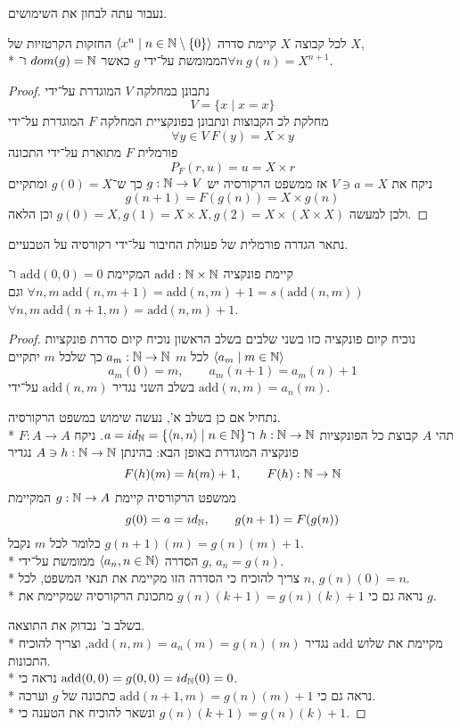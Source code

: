 נעבור עתה לבחון את השימושים.
\begin{theorem}
	לכל קבוצה $X$ קיימת סדרה $\langle x^n \mid n \in \mathbb{N} \setminus \{0\}\rangle$ החזקות הקרטזיות של $X$, \\*
	הממומשת על־ידי $g$ כאשר $dom(g) = \mathbb{N}$ ו־$\forall n\ g(n) = X^{n + 1}$.
\end{theorem}
\begin{proof}
	נתבונן במחלקה $V$ המוגדרת על־ידי
	\[
		V = \{ x \mid x = x \}
	\]
	מחלקת לכ הקבוצות ונתבונן בפונקציית המחלקה $F$ המוגדרת על־ידי
	\[
		\forall y \in V\ F(y) = X \times y
	\]
	פורמלית $F$ מתוארת על־ידי התכונה
	\[
		P_F(r, u) = u = X \times r
	\]
	ניקח את $V \ni a = X$ אז ממשפט הרקורסיה יש $g : \mathbb{N} \to V$ כך ש־$g(0) = X$ ומתקיים
	\[
		g(n + 1) = F(g(n)) = X \times g(n)
	\]
	ולכן למעשה $g(0) = X, g(1) = X \times X, g(2) = X \times (X \times X)$ וכן הלאה.
\end{proof}
נתאר הגדרה פורמלית של פעולת החיבור על־ידי רקורסיה על הטבעיים.
\begin{theorem}
	קיימת פונקציה $\text{add} : \mathbb{N} \times \mathbb{N}$ המקיימת $\text{add}(0, 0) = 0$
	ו־$\forall n, m\ \text{add}(n, m + 1) = \text{add}(n, m) + 1 = s(\text{add}(n, m))$
	וגם $\forall n, m\ \text{add}(n + 1, m) = \text{add}(n, m) + 1$.
\end{theorem}
\begin{proof}
	נוכיח קיום פונקציה כזו בשני שלבים
	בשלב הראשון נוכיח קיום סדרת פונקציות $\langle a_m \mid m \in \mathbb{N} \rangle$ לכל $m$ $a_m : \mathbb{N} \to \mathbb{N}$
	כך שלכל $m$ יתקיים
	\[
		a_m(0) = m,
		\qquad
		a_m(n + 1) = a_m(n) + 1
	\]
	בשלב השני נגדיר $\text{add}(n, m)$ על־ידי $\text{add}(n, m) = a_n(m)$.

	נתחיל אם כן בשלב א', נעשה שימוש במשפט הרקורסיה. \\*
	תהי $A$ קבוצת כל הפונקציות $h : \mathbb{N} \to \mathbb{N}$ ו־$a = id_{\mathbb{N}} = \{ \langle n, n \rangle \mid n \in \mathbb{N} \}$.
	ניקח $F : A \to A$ פונקציה המוגדרת באופן הבא: בהינתן $A \ni h : \mathbb{N} \to \mathbb{N}$ נגדיר
	\[
		F(h)(m) = h(m) + 1,
		\qquad
		F(h) : \mathbb{N} \to \mathbb{N}
	\]
	ממשפט הרקורסיה קיימת $g : \mathbb{N} \to A$ המקיימת
	\[
		g(0) = a = id_{\mathbb{N}},
		\qquad
		g(n + 1) = F(g(n))
	\]
	כלומר לכל $m$ נקבל $g(n + 1)(m) = g(n)(m) + 1$. \\*
	הסדרה $\langle a_n, n \in \mathbb{N} \rangle$ ממומשת על־ידי $g$, $a_n = g(n)$. \\*
	צריך להוכיח כי הסדרה הזו מקיימת את תנאי המשפט, לכל $n$, $g(n)(0) = n$. \\*
	נראה גם כי $g(n)(k + 1) = g(n)(k) + 1$ מתכונת הרקורסיה שמקיימת את $g$.

	בשלב ב' נבדוק את התוצאה. \\*
	נגדיר $\text{add}(n, m) = a_n(m) = g(n)(m)$, וצריך להוכיח add מקיימת את שלוש התכונות. \\*
	נראה כי $\text{add}(0, 0) = g(0, 0) = id_{\mathbb{N}}(0) = 0$. \\*
	נראה גם כי $\text{add}(n + 1, m) = g(n)(m) + 1$ כתכונה של $g$ וערכה. \\*
	ונשאר להוכיח את הטענה כי $g(n)(k + 1) = g(n)(k) + 1$.
\end{proof}
